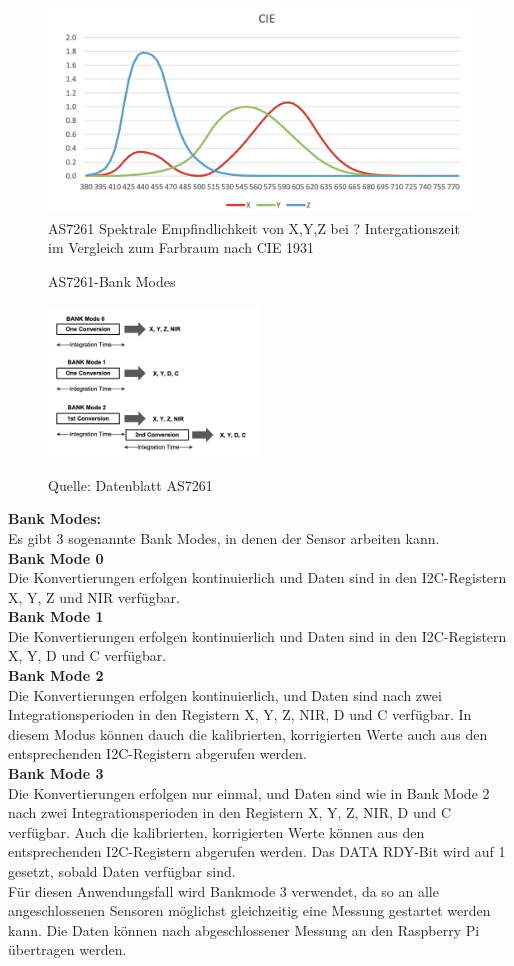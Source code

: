 \begin{figure}[H]
  \centering
 \includegraphics[width=0.6\linewidth]{img/AS7261-Spectral_Responsivity.png}
  \caption{AS7261 Spektrale Empfindlichkeit von X,Y,Z bei ? Intergationszeit im Vergleich zum Farbraum nach CIE 1931}
  \label{fig:AS7261-Sensor_Array}
\end{figure}


\begin{figure}
\centering
\caption{AS7261-Bank Modes}
\includegraphics[width=0.5\textwidth]{img/AS7261-Bank_Modes.png}
\label{fig:AS7261-Bank_Modes}
 \caption*{Quelle: Datenblatt AS7261}
\end{figure}

\noindent \textbf{Bank Modes:}\\
Es gibt 3 sogenannte Bank Modes, in denen der Sensor arbeiten kann.\\
\textbf{Bank Mode 0}\\
Die Konvertierungen erfolgen kontinuierlich und Daten sind in den I2C-Registern X, Y, Z und NIR verfügbar.\\
\textbf{Bank Mode 1}\\
Die Konvertierungen erfolgen kontinuierlich und Daten sind in den I2C-Registern X, Y, D und C verfügbar.\\
\textbf{Bank Mode 2}\\
Die Konvertierungen erfolgen kontinuierlich, und Daten sind nach zwei Integrationsperioden in den Registern X, Y, Z, NIR, D und C verfügbar. 
In diesem Modus können dauch die kalibrierten, korrigierten Werte auch aus den entsprechenden I2C-Registern abgerufen werden.\\
\textbf{Bank Mode 3}\\
Die Konvertierungen erfolgen nur einmal, und Daten sind wie in Bank Mode 2 nach zwei Integrationsperioden in den Registern X, Y, Z, NIR, D und C verfügbar.
Auch die kalibrierten, korrigierten Werte können aus den entsprechenden I2C-Registern abgerufen werden.
Das DATA RDY-Bit wird auf 1 gesetzt, sobald Daten verfügbar sind.\\
Für diesen Anwendungsfall wird Bankmode 3 verwendet, da so an alle angeschlossenen Sensoren möglichst gleichzeitig eine Messung gestartet werden kann.
Die Daten können nach abgeschlossener Messung an den Raspberry Pi übertragen werden.

